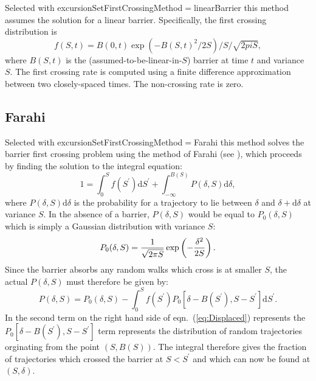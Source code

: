 Selected with {\normalfont \ttfamily excursionSetFirstCrossingMethod}$=${\normalfont \ttfamily linearBarrier} this method assumes the solution for a linear barrier. Specifically, the first crossing distribution is
\begin{equation}
 f(S,t) = B(0,t) \exp(- B(S,t)^2/2S)/S/\sqrt{2 pi S},
\end{equation}
where $B(S,t)$ is the (assumed-to-be-linear-in-$S$) barrier at time $t$ and variance $S$. The first crossing rate is computed using a finite difference approximation between two closely-spaced times. The non-crossing rate is zero.

\subsection{Farahi}

Selected with {\normalfont \ttfamily excursionSetFirstCrossingMethod}$=${\normalfont \ttfamily Farahi} this method solves the barrier first crossing problem using the method of Farahi (see \citealt{benson_dark_2012}), which proceeds by finding the solution to the integral equation:
\begin{equation}
  1 =  \int_0^S f(S^\prime){\mathrm d}S^\prime + \int_{-\infty}^{B(S)} P(\delta,S) {\mathrm d} \delta,
 \label{eq:OldExcursionMethod}
\end{equation}
where $P(\delta,S) {\mathrm d} \delta$ is the probability for a trajectory to lie between $\delta$ and $\delta + {\mathrm d} \delta$ at variance $S$. In the absence of a barrier, $P(\delta,S)$ would be equal to $P_0(\delta,S)$ which is simply a Gaussian distribution with variance $S$:
\begin{equation}
  P_0(\delta,S) = \frac{1}{\sqrt{2 \pi S}} \exp\left(-{\delta^2 \over 2 S}\right).
  \label{eq:Gaussian}
\end{equation}
Since the barrier absorbs any random walks which cross is at smaller $S$, the actual $P(\delta,S)$ must therefore be given by:
\begin{equation}
   P(\delta,S) = P_0(\delta,S) - \int_{0}^{S} f(S^\prime) P_0[\delta - B(S^\prime),S - S^\prime]{\mathrm d}S^\prime .
 \label{eq:Displaced}
\end{equation}
In the second term on the right hand side of eqn.~(\ref{eq:Displaced}) represents the $P_0[\delta - B(S^\prime),S - S^\prime]$ term represents the distribution of random trajectories orginating from the point $(S,B(S))$. The integral therefore gives the fraction of trajectories which crossed the barrier at $S<S^\prime$ and which can now be found at $(S,\delta)$.

